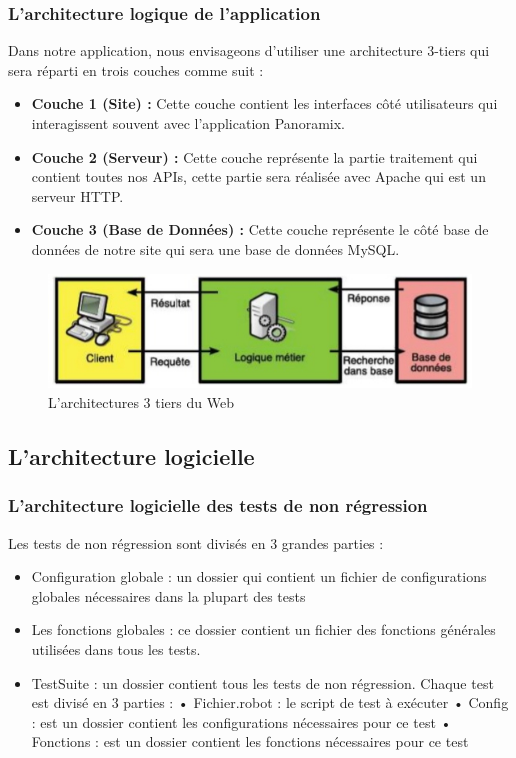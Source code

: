 \subsubsection{L'architecture logique de l’application}
Dans notre application, nous envisageons d’utiliser une architecture 3-tiers qui sera réparti en trois couches comme suit :
\begin{itemize}
	\item\textbf{ Couche 1 (Site) :} Cette couche contient les interfaces côté utilisateurs qui interagissent souvent avec l’application Panoramix.
	\item\textbf{ Couche 2 (Serveur) : }Cette couche représente la partie traitement qui contient toutes nos APIs, cette partie sera réalisée avec Apache qui est un serveur HTTP.
	\item \textbf{Couche 3 (Base de Données) :} Cette couche représente le côté base de données de notre site qui sera une base de données MySQL.
\end{itemize}
\begin{figure}[H]
	\centering
	\includegraphics[width=0.7\linewidth]{img/architectures-3tiers-web}
	\caption[L'architectures 3 tiers du Web]{L'architectures 3 tiers du Web}
	\label{fig:architectures-3tiers-web}
\end{figure}

\subsection[L'architecture logicielle]{L'architecture logicielle}
\subsubsection{L'architecture logicielle des tests de non régression}
Les tests de non régression sont divisés en 3 grandes parties :
\begin{itemize}
	\item Configuration globale : un dossier qui contient un fichier de configurations globales nécessaires dans la plupart des tests
	\item Les fonctions globales : ce dossier contient un fichier des fonctions générales utilisées dans tous les tests.
	\item TestSuite :  un dossier contient tous les tests de non régression. Chaque test est divisé en 3 parties :
		\subitem • Fichier.robot : le script de test à exécuter
		\subitem • Config : est un dossier contient les configurations nécessaires pour ce test
		\subitem • Fonctions : est un dossier contient les fonctions nécessaires pour ce test
\end{itemize}
